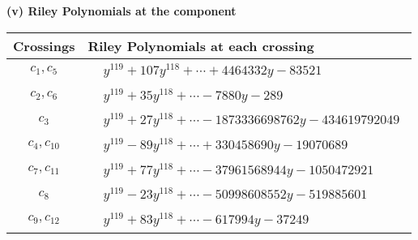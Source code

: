 \documentclass[1p]{elsarticle_modified}
\theoremstyle{definition}
\begin{document}
\newpage\renewcommand{\arraystretch}{1}
\flushleft \textbf{(v) Riley Polynomials at the component}\newline \\
\begin{tabular}{m{50pt}|m{274pt}}
Crossings & \hspace{64pt}Riley Polynomials at each crossing \\
\hline $$\begin{aligned}c_{1},c_{5}\end{aligned}$$&$\begin{aligned}
&y^{119}+107 y^{118}+\cdots+4464332 y-83521
\end{aligned}$\\
\hline $$\begin{aligned}c_{2},c_{6}\end{aligned}$$&$\begin{aligned}
&y^{119}+35 y^{118}+\cdots-7880 y-289
\end{aligned}$\\
\hline $$\begin{aligned}c_{3}\end{aligned}$$&$\begin{aligned}
&y^{119}+27 y^{118}+\cdots-1873336698762 y-434619792049
\end{aligned}$\\
\hline $$\begin{aligned}c_{4},c_{10}\end{aligned}$$&$\begin{aligned}
&y^{119}-89 y^{118}+\cdots+330458690 y-19070689
\end{aligned}$\\
\hline $$\begin{aligned}c_{7},c_{11}\end{aligned}$$&$\begin{aligned}
&y^{119}+77 y^{118}+\cdots-37961568944 y-1050472921
\end{aligned}$\\
\hline $$\begin{aligned}c_{8}\end{aligned}$$&$\begin{aligned}
&y^{119}-23 y^{118}+\cdots-50998608552 y-519885601
\end{aligned}$\\
\hline $$\begin{aligned}c_{9},c_{12}\end{aligned}$$&$\begin{aligned}
&y^{119}+83 y^{118}+\cdots-617994 y-37249
\end{aligned}$\\
\hline
\end{tabular}\\~\\
\end{document}
